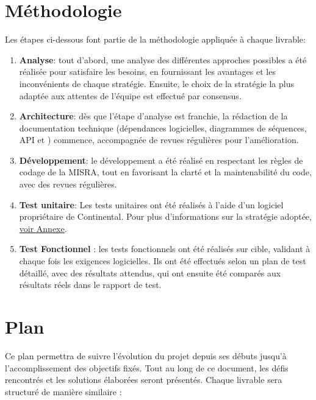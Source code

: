 \documentclass[a4paper, 12pt]{report}
\begin{document}
\section{Méthodologie} \label{sec:Méthode}
Les étapes ci-dessous font partie de la méthodologie appliquée à chaque livrable:
\begin{enumerate}
\item \textbf{Analyse}:
tout d'abord, une analyse des différentes approches possibles a été réalisée pour satisfaire les besoins, en fournissant les avantages et les inconvénients de chaque stratégie. Ensuite, le choix de la stratégie la plus adaptée aux attentes de l'équipe est effectué par consensus.

\item \textbf{Architecture}:
dès que l'étape d'analyse est franchie, la rédaction de la documentation technique (dépendances logicielles, diagrammes de séquences, \ac{API} et ) commence, accompagnée de revues régulières pour l'amélioration.

\item \textbf{Développement}:
    le développement a été réalisé en respectant les règles de codage de la \ac{MISRA}, tout en favorisant la clarté et la maintenabilité du code, avec des revues régulières.

\item \textbf{Test unitaire}:
Les tests unitaires ont été réalisés à l'aide d'un logiciel propriétaire de Continental. Pour plus d'informations sur la stratégie adoptée, \hyperref[subsec:ut]{voir Annexe}.


    \item \textbf{Test Fonctionnel} :
    les tests fonctionnels ont été réalisés sur cible, validant à chaque fois les exigences logicielles. Ils ont été effectués selon un plan de test détaillé, avec des résultats attendus, qui ont ensuite été comparés aux résultats réels dans le rapport de test.
\end{enumerate}

\section{Plan}

Ce plan permettra de suivre l'évolution du projet depuis ses débuts jusqu'à l'accomplissement des objectifs fixés. Tout au long de ce document, les défis rencontrés et les solutions élaborées seront présentés. Chaque livrable sera structuré de manière similaire : \\
\end{document}
